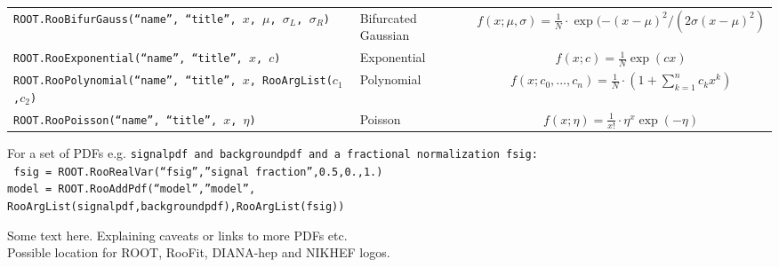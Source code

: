 \documentclass[landscape,a0paper,fontscale=0.33]{baposter} %
\begin{document}
\begin{poster}
{\begin{multicols}{3}
\columnbreak

\begin{tcolorbox}[width=2.05\linewidth,colback=blue!5!white,colframe=blue!75!black,title=Common P.D.Fs]
\begin{tabular}{l | l c}
\tt{ROOT.RooBifurGauss(``name'', ``title'', $x$, $\mu$, $\sigma_L$, $\sigma_R$)} & Bifurcated Gaussian & $f(x;\mu,\sigma)=\frac{1}{N}\cdot \exp(-(x-\mu)^2/(2\sigma(x-\mu)^2)$\\
\tt{ROOT.RooExponential(``name'', ``title'', $x$, $c$)} & Exponential & $f(x;c)=\frac{1}{N}\exp (c x)$\\
\tt{ROOT.RooPolynomial(``name'', ``title'', $x$, RooArgList($c_1$,$c_2$)} & Polynomial & $f(x;c_0,...,c_n)=\frac{1}{N}\cdot\left(1+\sum_{k=1}^{n}c_kx^k\right)$\\
\tt{ROOT.RooPoisson(``name'', ``title'', $x$, $\eta$)} & Poisson & $f(x;\eta)=\frac{1}{x!}\cdot\eta^x\exp(-\eta)$
\end{tabular}
\end{tcolorbox}
\begin{tcolorbox}[colback=blue!5!white,colframe=blue!75!black,width=1.03\linewidth,title=Composite Models from P.D.Fs]
For a set of PDFs e.g. \tt{signalpdf} and \tt{backgroundpdf} and a fractional normalization \tt{fsig}:\\
\tt{
fsig = ROOT.RooRealVar(``fsig'',''signal fraction'',0.5,0.,1.)\\
model = ROOT.RooAddPdf(``model'',''model'',\\
\hspace*{2cm}RooArgList(signalpdf,backgroundpdf),RooArgList(fsig))
}
\end{tcolorbox}

\columnbreak
\vspace*{3cm}
Some text here. Explaining caveats or links to more PDFs etc.\\

Possible location for ROOT, RooFit, DIANA-hep and NIKHEF logos. 
\columnbreak


\end{multicols}
}



\end{poster}
\end{document}

